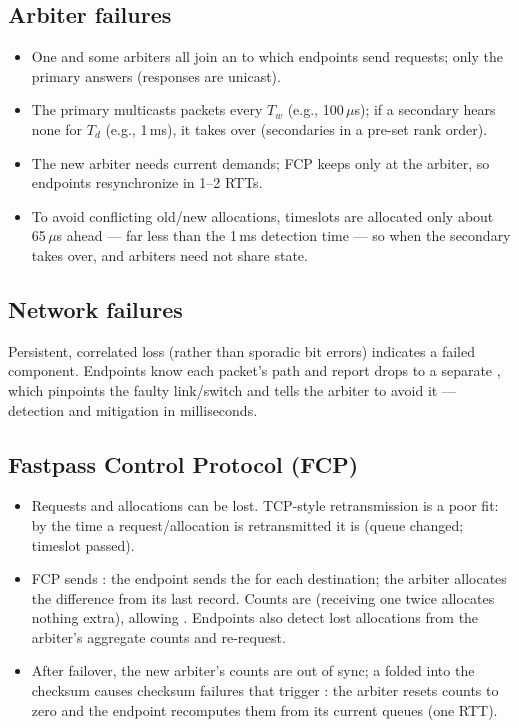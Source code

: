 \subsection{Arbiter failures}
\begin{itemize}
\item One  and some  arbiters all join an  to which endpoints send requests; only the primary answers (responses are unicast).
\item The primary multicasts  packets every $T_w$ (e.g., 100\,$\mu$s); if a secondary hears none for $T_d$ (e.g., 1\,ms), it takes over (secondaries in a pre-set rank order).
\item The new arbiter needs current demands; FCP keeps only  at the arbiter, so endpoints resynchronize in 1--2 RTTs.
\item To avoid conflicting old/new allocations, timeslots are allocated only about 65\,$\mu$s ahead --- far less than the 1\,ms detection time --- so  when the secondary takes over, and arbiters need not share state.
\end{itemize}
\subsection{Network failures}
Persistent, correlated loss (rather than sporadic bit errors) indicates a failed component. Endpoints know each packet's path and report drops to a separate , which pinpoints the faulty link/switch and tells the arbiter to avoid it --- detection and mitigation in milliseconds.

\subsection{Fastpass Control Protocol (FCP)}
\begin{itemize}
\item Requests and allocations can be lost. TCP-style retransmission is a poor fit: by the time a request/allocation is retransmitted it is  (queue changed; timeslot passed).
\item FCP sends : the endpoint sends the  for each destination; the arbiter allocates the difference from its last record. Counts are  (receiving one twice allocates nothing extra), allowing . Endpoints also detect lost allocations from the arbiter's aggregate counts and re-request.
\item After failover, the new arbiter's counts are out of sync; a  folded into the checksum causes checksum failures that trigger : the arbiter resets counts to zero and the endpoint recomputes them from its current queues (one RTT).
\end{itemize}

